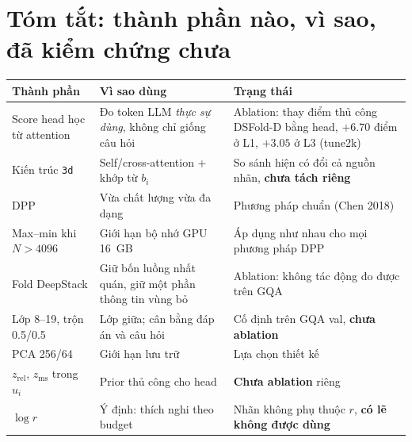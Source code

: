 \documentclass[11pt,a4paper]{article}
\begin{document}
\section{Tóm tắt: thành phần nào, vì sao, đã kiểm chứng chưa}

\begin{center}
\small
\begin{tabular}{@{}p{3.2cm}p{6.4cm}p{5.6cm}@{}}
\toprule
Thành phần & Vì sao dùng & Trạng thái\\
\midrule
Score head học từ attention & Đo token LLM \emph{thực sự dùng}, không chỉ giống câu hỏi & Ablation: thay điểm thủ công DSFold-D bằng head, $+6.70$ điểm ở L1, $+3.05$ ở L3 (tune2k)\\
Kiến trúc \texttt{3d} & Self/cross-attention + khớp từ $b_i$ & So sánh hiện có đổi cả nguồn nhãn, \textbf{chưa tách riêng}\\
DPP & Vừa chất lượng vừa đa dạng & Phương pháp chuẩn (Chen 2018)\\
Max--min khi $N>4096$ & Giới hạn bộ nhớ GPU 16~GB & Áp dụng như nhau cho mọi phương pháp DPP\\
Fold DeepStack & Giữ bốn luồng nhất quán, giữ một phần thông tin vùng bỏ & Ablation: không tác động đo được trên GQA\\
Lớp 8--19, trộn 0.5/0.5 & Lớp giữa; cân bằng đáp án và câu hỏi & Cố định trên GQA val, \textbf{chưa ablation}\\
PCA 256/64 & Giới hạn lưu trữ & Lựa chọn thiết kế\\
$z_\text{rel}$, $z_\text{ms}$ trong $u_i$ & Prior thủ công cho head & \textbf{Chưa ablation} riêng\\
$\log r$ & Ý định: thích nghi theo budget & Nhãn không phụ thuộc $r$, \textbf{có lẽ không được dùng}\\
\bottomrule
\end{tabular}
\end{center}
\end{document}
